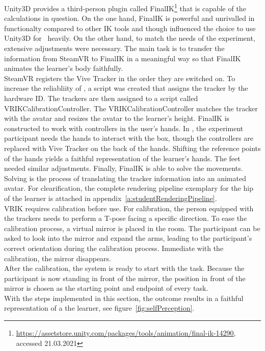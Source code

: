 Unity3D provides a third-person plugin called FinalIK\footnote{\href{https://assetstore.unity.com/packages/tools/animation/final-ik-14290}{https://assetstore.unity.com/packages/tools/animation/final-ik-14290}, accessed 21.03.2021} that is capable of the calculations in question. On the one hand, FinalIK is powerful and unrivalled in functionalty compared to other IK tools and though influenced the choice to use Unity3D for \exgo\ heavily. On the other hand, to match the needs of the experiment, extensive adjustments were necessary. The main task is to transfer the information from SteamVR to FinalIK in a meaningful way so that FinalIK animates the learner's body faithfully.\\
SteamVR registers the Vive Tracker in the order they are switched on. To increase the reliabliity of \exgo, a script was created that assigns the tracker by the hardware ID. The trackers are then assigned to a script called VRIKCalibrationController. The VRIKCalibrationController matches the tracker with the avatar and resizes the avatar to the learner's height. FinalIK is constructed to work with controllers in the user's hands. In \exgo, the experiment participant needs the hands to interact with the box, though the controllers are replaced with Vive Tracker on the back of the hands. Shifting the reference points of the hands yields a faithful representation of the learner's hands. The feet needed similar adjustments. Finally, FinalIK is able to solve the movements. Solving is the process of translating the tracker information into an animated avatar. For clearification, the complete rendering pipeline exemplary for the hip of the learner is attached in appendix~\ref{a:studentRenderingPipeline}.\\
VRIK requires calibration before use. For calibration, the person equipped with the trackers needs to perform a T-pose facing a specific direction. To ease the calibration process, a virtual mirror is placed in the room. The participant can be asked to look into the mirror and expand the arms, leading to the participant's correct orientation during the calibration process. Immediate with the calibration, the mirror disappears.\\
After the calibration, the system is ready to start with the task. Because the participant is now standing in front of the mirror, the position in front of the mirror is chosen as the starting point and endpoint of every task.\\
With the steps implemented in this section, the outcome results in a faithful representation of a the learner, see figure~\ref{fig:selfPerception}.\\

